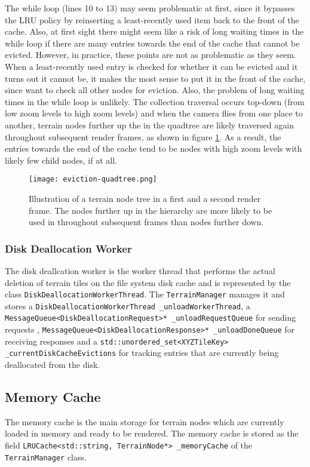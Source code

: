 The while loop (lines 10 to 13) may seem problematic at first,
since it bypasses the LRU policy by reinserting a 
least-recently used item back to the front of the cache.
Also, at first sight there might seem like a risk of long waiting times in the while loop
if there are many entries towards the end of the cache 
that cannot be evicted. However, in practice, these points 
are not as problematic as they seem. When a least-recently used entry
is checked for whether it can be evicted and it turns out it cannot be,
it makes the most sense to put it in the front of the cache, 
since want to check all other nodes for eviction.
Also, the problem of long waiting times in the while loop is unlikely.
The collection traversal occurs top-down (from low zoom levels to high zoom levels) and 
when the camera flies from one place to another, terrain nodes further up the in the quadtree 
are likely traversed again throughout subsequent render frames, as shown in figure \ref{fig:eviction-quadtree}.
As a result, the entries towards 
the end of the cache tend to be nodes with high zoom levels with likely 
few child nodes, if at all.

\begin{figure}[H]
  \centering
  \texttt{[image: eviction-quadtree.png]}
  \caption{Illustration of a terrain node tree in a first and a second render frame.
  The nodes further up in the hierarchy are more likely to be used in 
  throughout subsequent frames than nodes further down.}\label{fig:eviction-quadtree}
\end{figure}

\subsubsection{Disk Deallocation Worker}
The disk deallcation worker is the worker thread that performs 
the actual deletion of terrain tiles on the file system disk cache
and is represented by the class \texttt{DiskDeallocationWorkerThread}.
The \texttt{TerrainManager} manages it and stores a \texttt{DiskDeallocationWorkerThread \_unloadWorkerThread},
a \texttt{MessageQueue<DiskDeallocationRequest>* \_unloadRequestQueue} for sending requests , 
\texttt{MessageQueue<DiskDeallocationResponse>* \_unloadDoneQueue} for receiving responses and 
a \texttt{std::unordered\_set<XYZTileKey> \_currentDiskCacheEvictions} for tracking 
entries that are currently being deallocated from the disk.

\subsection{Memory Cache}
The memory cache is the main storage for 
terrain nodes which are currently loaded in memory and ready 
to be rendered. The memory cache is stored
as the field \texttt{LRUCache<std::string, TerrainNode*> \_memoryCache} of the \texttt{TerrainManager}
class.

